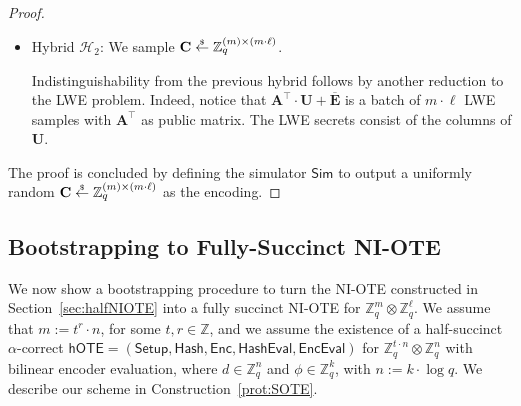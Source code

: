 \documentclass{article}
\newcommand{\getsr}{\overset{\raisebox{-1pt}{$\scriptscriptstyle \$$}}{\gets}}
\newcommand{\sample}{\getsr}
\newcommand{\BOTE}{\mathsf{hOTE}}
\newcommand{\Z}{\mathbb{Z}}
\newcommand{\Sim}{\mathsf{Sim}}
\newcommand{\algofont}[1]{\ensuremath{\mathsf{#1}}}
\newcommand{\Enc}{{\algofont{Enc}}}
\newcommand{\Setup}{{\algofont{Setup}}}
\newcommand{\Eval}{\algofont{Eval}\xspace}
\newcommand{\Hash}{{\algofont{Hash}}}
\begin{document}
\begin{proof}
\begin{itemize}
        \item Hybrid $\mathcal{H}_2$: We sample $\mathbf{C}\sample\Z_q^{(m)\times (m\cdot \ell)}$.

        Indistinguishability from the previous hybrid follows by another reduction to the LWE problem. Indeed, notice that $\mathbf{A}^\intercal\cdot \mathbf{U}+\overline{\mathbf{E}}$ is a batch of $m\cdot \ell$ LWE samples with $\mathbf{A}^\intercal$ as public matrix. The LWE secrets consist of the columns of $\mathbf{U}$.
    \end{itemize}
    The proof is concluded by defining the simulator $\Sim$ to output a uniformly random $\mathbf{C}\sample\Z_q^{(m)\times (m\cdot \ell)}$ as the encoding.
\end{proof}







\subsection{Bootstrapping to Fully-Succinct NI-OTE}\label{sec:NIOTE}

We now show a bootstrapping procedure to turn the NI-OTE constructed in Section~\ref{sec:halfNIOTE} into a fully succinct NI-OTE for $\Z_q^{m} \otimes \Z_q^\ell$. We assume that $m := t^r \cdot n$, for some $t,r\in \Z$, and we assume the existence of a half-succinct $\alpha$-correct $\BOTE=(\Setup, \allowbreak \Hash, \allowbreak \Enc, \allowbreak \Hash\Eval, \allowbreak \Enc\Eval)$ for  $\Z_q^{t\cdot n}\otimes \Z_q^n$ with bilinear encoder evaluation, where $d \in \Z_q^n$ and $\phi \in \Z_q^k$, with $n:= k \cdot \log q$. We describe our scheme in Construction~\ref{prot:SOTE}.
\end{document}
